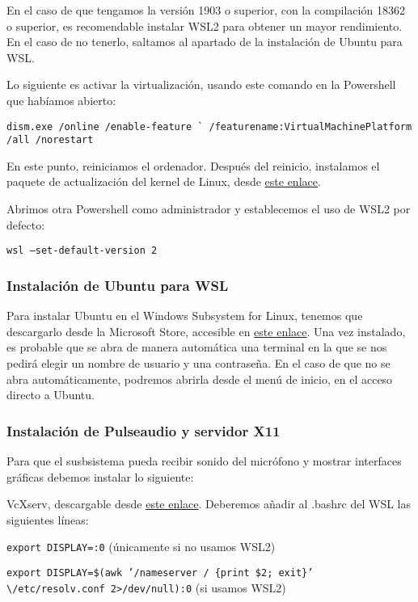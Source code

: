 En el caso de que tengamos la versión 1903 o superior, con la compilación 18362 o superior, es recomendable instalar WSL2 para obtener un mayor rendimiento. En el caso de no tenerlo, saltamos al apartado de la instalación de Ubuntu para WSL.

Lo siguiente es activar la virtualización, usando este comando en la Powershell que habíamos abierto:

\texttt{dism.exe /online /enable-feature \`{}\newline
/featurename:VirtualMachinePlatform /all /norestart}

En este punto, reiniciamos el ordenador. Después del reinicio, instalamos el paquete de actualización del kernel de Linux, desde \href{https://wslstorestorage.blob.core.windows.netwslblob/wsl_update_x64.msi}{este enlace}.

Abrimos otra Powershell como administrador y establecemos el uso de WSL2 por defecto:

\texttt{wsl --set-default-version 2}

\subsubsection{Instalación de Ubuntu para WSL}
Para instalar Ubuntu en el Windows Subsystem for Linux, tenemos que descargarlo desde la Microsoft Store, accesible en \href{https://www.microsoft.com/es-es/p/ubuntu/9nblggh4msv6}{este enlace}. Una vez instalado, es probable que se abra de manera automática una terminal en la que se nos pedirá elegir un nombre de usuario y una contraseña. En el caso de que no se abra automáticamente, podremos abrirla desde el menú de inicio, en el acceso directo a Ubuntu.

\subsubsection{Instalación de Pulseaudio y servidor X11}
Para que el susbsistema pueda recibir sonido del micrófono y mostrar interfaces gráficas debemos instalar lo siguiente:

VcXserv, descargable desde \href{https://sourceforge.net/projects/vcxsrv/}{este enlace}. Deberemos añadir al .bashrc del WSL las siguientes líneas:

\texttt{export DISPLAY=:0} (únicamente si no usamos WSL2)

\texttt{export DISPLAY=\$(awk '/nameserver / \{print \$2; exit\}' \textbackslash\newline/etc/resolv.conf 2>/dev/null):0} (si usamos WSL2)

